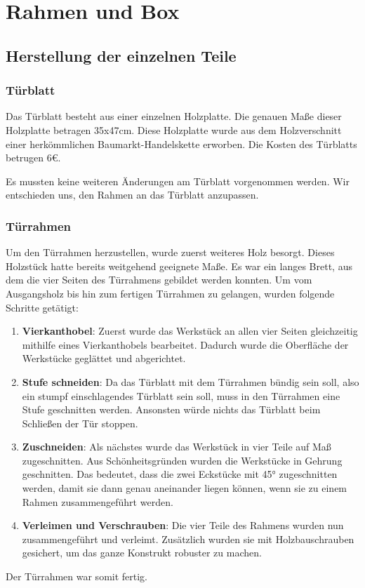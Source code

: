 \chapter{Rahmen und Box}
\section{Herstellung der einzelnen Teile}
\subsection{Türblatt}
Das Türblatt besteht aus einer einzelnen Holzplatte. Die genauen Maße dieser Holzplatte betragen 35x47cm.
Diese Holzplatte wurde aus dem Holzverschnitt einer herkömmlichen Baumarkt-Handelskette erworben. Die Kosten des
Türblatts betrugen 6€.

Es mussten keine weiteren Änderungen am Türblatt vorgenommen werden. Wir entschieden uns,
den Rahmen an das Türblatt anzupassen.

\subsection{Türrahmen}
Um den Türrahmen herzustellen, wurde zuerst weiteres Holz besorgt. Dieses Holzstück hatte bereits weitgehend geeignete Maße.
Es war ein langes Brett, aus dem die vier Seiten des Türrahmens gebildet werden konnten.
Um vom Ausgangsholz bis hin zum fertigen Türrahmen zu gelangen, wurden folgende Schritte getätigt:
\begin{enumerate}
    \item \textbf{Vierkanthobel}: Zuerst wurde das Werkstück an allen vier Seiten gleichzeitig mithilfe eines Vierkanthobels bearbeitet.
    Dadurch wurde die Oberfläche der Werkstücke geglättet und abgerichtet.
    \item \textbf{Stufe schneiden}: Da das Türblatt mit dem Türrahmen bündig sein soll, also ein stumpf einschlagendes Türblatt sein soll,
    muss in den Türrahmen eine Stufe geschnitten werden. Ansonsten würde nichts das Türblatt beim Schließen der Tür stoppen.
    \item \textbf{Zuschneiden}: Als nächstes wurde das Werkstück in vier Teile auf Maß zugeschnitten. Aus Schönheitsgründen wurden die
    Werkstücke in Gehrung geschnitten. Das bedeutet, dass die zwei Eckstücke mit 45° zugeschnitten werden, damit sie dann genau aneinander
    liegen können, wenn sie zu einem Rahmen zusammengeführt werden.
    \item \textbf{Verleimen und Verschrauben}: Die vier Teile des Rahmens wurden nun zusammengeführt und verleimt. Zusätzlich wurden sie mit
    Holzbauschrauben gesichert, um das ganze Konstrukt robuster zu machen.
\end{enumerate}
Der Türrahmen war somit fertig.

